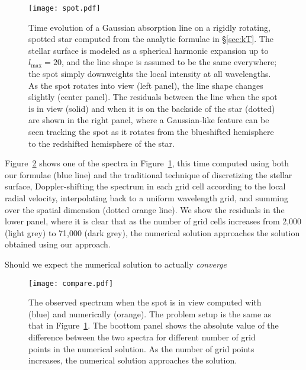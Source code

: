 \documentclass[modern]{aastex631}
\begin{document}
\begin{figure}[p!]
    \begin{centering}
        \texttt{[image: spot.pdf]}
        \caption{%
            Time evolution of a Gaussian absorption line on a rigidly rotating, spotted star computed from the analytic formulae in \S\ref{sec:kT}.
            The stellar surface is modeled as a spherical harmonic expansion up to $l_\mathrm{max}=20$, and the line shape is assumed to be the same everywhere;
            the spot simply downweights the local intensity at all wavelengths.
            As the spot rotates into view (left panel), the line shape changes slightly (center panel). 
            The residuals between the line when the spot is in view (solid) and when it is on the backside of the star (dotted) are shown in the right panel, where a Gaussian-like feature can be seen tracking the spot as it rotates from the blueshifted hemisphere to the redshifted hemisphere of the star.
        }
        \label{fig:spot}
    \end{centering}
\end{figure}

Figure~\ref{fig:compare} shows one of the spectra in Figure~\ref{fig:spot}, this time computed using both our formulae (blue line) and the traditional technique of discretizing the stellar surface, Doppler-shifting the spectrum in each grid cell according to the local radial velocity, interpolating back to a uniform wavelength grid, and summing over the spatial dimension (dotted orange line). 
We show the residuals in the lower panel, where it is clear that as the number of grid cells increases from 2,000 (light grey) to 71,000 (dark grey), the numerical solution approaches the solution obtained using our approach.

Should we expect the numerical solution to actually \emph{converge}

\begin{figure}[t!]
    \begin{centering}
        \texttt{[image: compare.pdf]}
        \caption{%
            The observed spectrum when the spot is in view computed with
            \starry (blue) and numerically (orange). 
            The problem setup is the same as that in Figure~\ref{fig:spot}. 
            The boottom panel shows the absolute value of the difference between the two spectra for different number of grid points in the numerical solution.
            As the number of grid points increases, the numerical solution approaches the \starry solution.
        }
        \label{fig:compare}
    \end{centering}
\end{figure}
\end{document}
